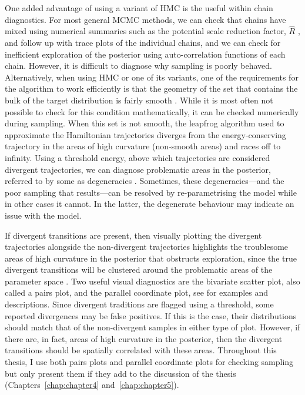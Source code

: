 One added advantage of using a variant of HMC is the useful within chain diagnostics. For most general MCMC methods, we can check that chains have mixed using numerical summaries such as the potential scale reduction factor, $\hat{R}$ \citep{Gelman1992}, and follow up with trace plots of the individual chains, and we can check for inefficient exploration of the posterior using auto-correlation functions of each chain. However, it is difficult to diagnose why sampling is poorly behaved. Alternatively, when using HMC or one of its variants, one of the requirements for the algorithm to work efficiently is that the geometry of the set that contains the bulk of the target distribution is fairly smooth \citep{gabry_vis_2019}. While it is most often not possible to check for this condition mathematically, it can be checked numerically during sampling. When this set is not smooth, the leapfrog algorithm used to approximate the Hamiltonian trajectories diverges from the energy-conserving trajectory in the areas of high curvature (non-smooth areas) and races off to infinity. Using a threshold energy, above which trajectories are considered divergent trajectories, we can diagnose problematic areas in the posterior\citep{gabry_vis_2019}, referred to by some as degeneracies \citep{betancourt_2020}. Sometimes, these degeneracies---and the poor sampling that results---can be resolved by re-parametrising the model \citep{betancourt2015} while in other cases it cannot. In the latter, the degenerate behaviour may indicate an issue with the model.

If divergent transitions are present, then visually plotting the divergent trajectories alongside the non-divergent trajectories highlights the troublesome areas of high curvature in the posterior that obstructs exploration, since the true divergent transitions will be clustered around the problematic areas of the parameter space \citep{gabry_vis_2019}. Two useful visual diagnostics are the bivariate scatter plot, also called a pairs plot, and the parallel coordinate plot, see \citep{gabry_vis_2019} for examples and descriptions. Since divergent traditions are flagged using a threshold, some reported divergences may be false positives. If this is the case, their distributions should match that of the non-divergent samples in either type of plot. However, if there are, in fact, areas of high curvature in the posterior, then the divergent transitions should be spatially correlated with these areas. Throughout this thesis, I use both pairs plots and parallel coordinate plots for checking sampling but only present them if they add to the discussion of the thesis (Chapters~\ref{chap:chapter4} and~\ref{chap:chapter5}).

